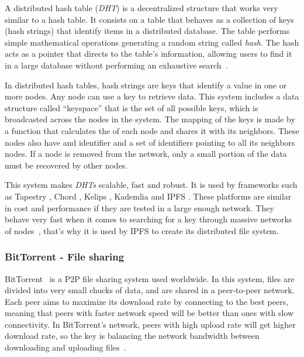 A distributed hash table (\emph{DHT}) is a decentralized structure that works
very similar to a hash table. It consists on a table that behaves as a
collection of keys (hash strings) that identify items in a distributed database.
The table performs simple mathematical operations generating a random string
called \emph{hash}. The hash acts as a pointer that directs to the table's
information, allowing users to find it in a large database without performing an
exhaustive search~\cite{kaluszka2010distributed}.

In distributed hash tables, hash strings are keys that identify a value in one
or more nodes. Any node can use a key to retrieve data. This system includes a
data structure called ``keyspace'' that is the set of all possible keys, which is
broadcasted across the nodes in the system. The mapping of the keys is made by a
function that calculates the  of each node and shares it with its
neighbors. These nodes also have and identifier and a set of identifiers
pointing to all its neighbors nodes. If a node is removed from the network, only
a small portion of the data must be recovered by other
nodes\cite{kaluszka2010distributed}.

This system makes \emph{DHTs} scalable, fast and robust. It is used by
frameworks such as Tapestry \cite{zhao2004tapestry}, Chord
\cite{stoica2001chord}, Kelips \cite{gupta2003kelips}, Kademlia
\cite{maymounkov2002kademlia} and IPFS \cite{benet2014ipfs}. These platforms are
similar in cost and performance if they are tested in a large enough network.
They behave very fast when it comes to searching for a key through massive
networks of nodes~\cite{li2004comparing}, that's why it is used by IPFS to
create its distributed file system.

\subsubsection*{BitTorrent - File sharing}
\label{tech:sec:ipfs:bt}
BitTorrent~\cite{cohen2003incentives} is a P2P file sharing system used
worldwide. In this system, files are divided into very small chucks of data, and
are shared in a peer-to-peer network. Each peer aims to maximize its download
rate by connecting to the best peers, meaning that peers with faster network
speed will be better than ones with slow connectivity. In BitTorrent's network,
peers with high upload rate will get higher download rate, so the key is
balancing the network bandwidth between downloading and uploading
files~\cite{pouwelse2005bittorrent}.


